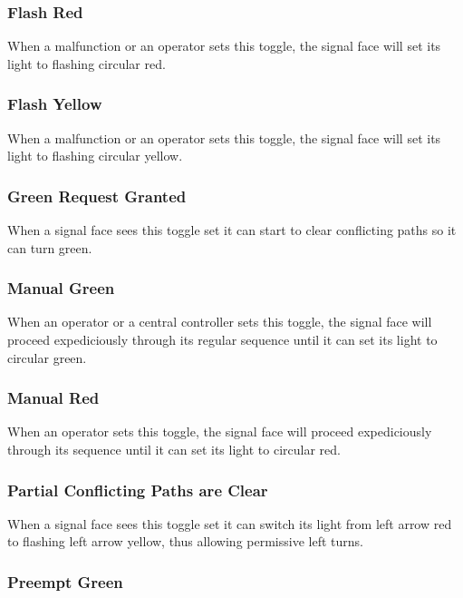 \documentclass[letterpaper,twoside]{article}
\begin{document}
\subsubsection{Flash Red}

When a malfunction or an operator sets this toggle, the signal face
will set its light to flashing circular red.

\subsubsection{Flash Yellow}

When a malfunction or an operator sets this toggle, the signal face
will set its light to flashing circular yellow.

\subsubsection{Green Request Granted}

When a signal face sees this toggle set it can start to clear conflicting
paths so it can turn green.

\subsubsection{Manual Green}

When an operator or a central controller sets this toggle,
the signal face will proceed
expediciously through its regular sequence until it can set its light to
circular green.

\subsubsection{Manual Red}

When an operator sets this toggle, the signal face will proceed
expediciously through its sequence until it can set its light to
circular red.

\subsubsection{Partial Conflicting Paths are Clear}

When a signal face sees this toggle set it can switch its light
from left arrow red to flashing left arrow yellow, thus allowing
permissive left turns.

\subsubsection{Preempt Green}
\end{document}
